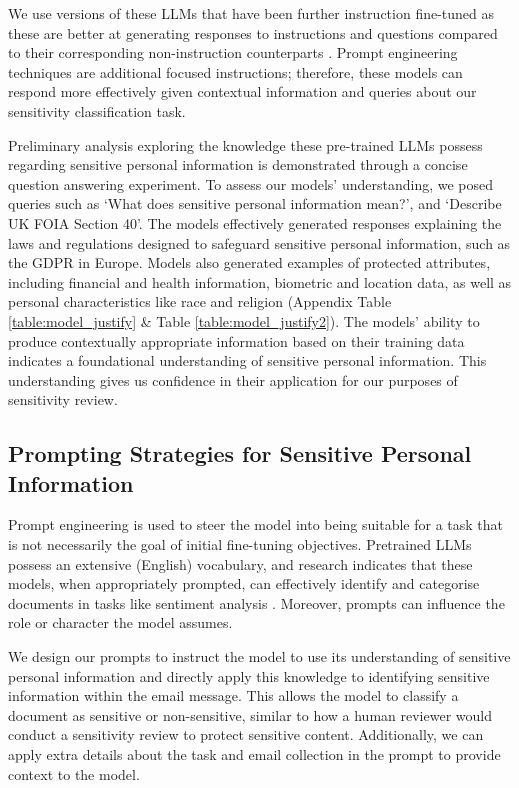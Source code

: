 We use versions of these LLMs that have been further instruction fine-tuned as these are better at generating responses to instructions and questions compared to their corresponding non-instruction counterparts \cite{wei2021finetuned}. Prompt engineering techniques are additional focused instructions; therefore, these models can respond more effectively given contextual information and queries about our sensitivity classification task.

Preliminary analysis exploring the knowledge these pre-trained LLMs possess regarding sensitive personal information is demonstrated through a concise question answering experiment. To assess our models’ understanding, we posed queries such as ‘What does sensitive personal information mean?’, and ‘Describe UK FOIA Section 40’. The models effectively generated responses explaining the laws and regulations designed to safeguard sensitive personal information, such as the GDPR in Europe. Models also generated examples of protected attributes, including financial and health information, biometric and location data, as well as personal characteristics like race and religion (Appendix Table \ref{table:model_justify} \& Table \ref{table:model_justify2}). The models' ability to produce contextually appropriate information based on their training data indicates a foundational understanding of sensitive personal information. This understanding gives us confidence in their application for our purposes of sensitivity review.

\subsection{Prompting Strategies for Sensitive Personal Information}
Prompt engineering is used to steer the model into being suitable for a task that is not necessarily the goal of initial fine-tuning objectives. Pretrained LLMs possess an extensive (English) vocabulary, and research indicates that these models, when appropriately prompted, can effectively identify and categorise documents in tasks like sentiment analysis \cite{kocon2023chatgpt, krugmann2024sentiment}. Moreover, prompts can influence the role or character the model assumes.

We design our prompts to instruct the model to use its understanding of sensitive personal information and directly apply this knowledge to identifying sensitive information within the email message. This allows the model to classify a document as sensitive or non-sensitive, similar to how a human reviewer would conduct a sensitivity review to protect sensitive content. Additionally, we can apply extra details about the task and email collection in the prompt to provide context to the model.

